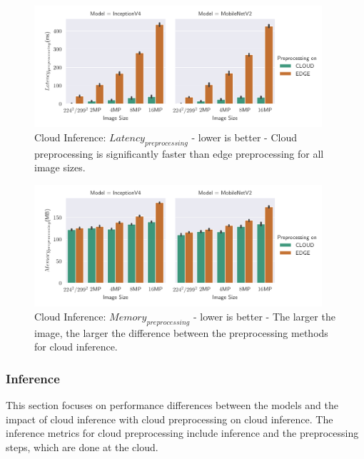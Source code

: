 \begin{figure}[!htb]
\centering
\includegraphics[width=0.95\textwidth]{./Bilder/single_plots/cloud_inference_plots/Cloud_Inference_Preprocessing_Latency.pdf}
\caption[Cloud Inference:  $Latency_{preprocessing}$ - lower is better]{Cloud Inference:  $Latency_{preprocessing}$ - lower is better - Cloud preprocessing is significantly faster than edge preprocessing for all image sizes.}
\label{fig:cloudInferencePreproLat}
\end{figure}

\begin{figure}[!htb]
\centering
\includegraphics[width=0.95\textwidth]{./Bilder/single_plots/cloud_inference_plots/Cloud_Inference_Preprocessing_Memory.pdf}
\caption[Cloud Inference:  $Memory_{preprocessing}$ - lower is better]{Cloud Inference:  $Memory_{preprocessing}$ - lower is better - The larger the image, the larger the difference between the preprocessing methods for cloud inference.}
\label{fig:cloudInferencePreproMemory}
\end{figure}

\FloatBarrier
\subsubsection{Inference}
This section focuses on performance differences between the models and the impact of cloud inference with cloud preprocessing on cloud inference.
The inference metrics for cloud preprocessing include inference and the preprocessing steps, which are done at the cloud.

